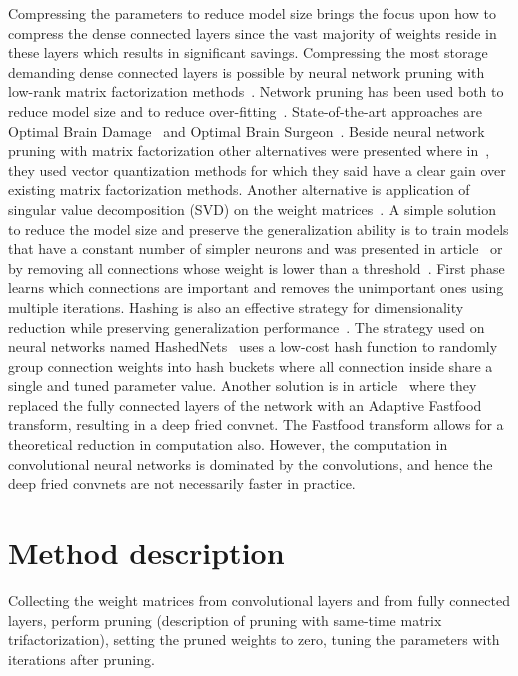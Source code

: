 \documentclass{article} %
\begin{document}
Compressing the parameters to reduce model size brings the focus upon how to 
compress the dense connected layers since the vast majority of weights reside in 
these layers which results in significant savings. Compressing the most storage 
demanding dense connected layers is possible by neural network pruning with 
low-rank matrix factorization methods~\cite{bondarenko2014artificial, 
schmidhuber2015deep, sainath2013low}. Network pruning has been used both to 
reduce model size and to reduce over-fitting~\cite{han2015learning}. 
State-of-the-art approaches are Optimal Brain Damage~\cite{lecun1989optimal} and 
Optimal Brain Surgeon~\cite{hassibi1993optimal}. Beside neural network pruning 
with matrix factorization other alternatives were presented where in~\cite{ 
DBLP:journals/corr/GongLYB14}, they used vector quantization methods for which 
they said have a clear gain over existing matrix factorization methods. Another 
alternative is application of singular value decomposition (SVD) on the weight 
matrices~\cite{xue2013restructuring}. A simple solution to reduce the model size 
and preserve the generalization ability is to train models that have a constant 
number of simpler neurons and was presented in article~\cite{collins2014memory} 
or by removing all connections whose weight is lower than a 
threshold~\cite{han2015learning}. First phase learns which connections are 
important and removes the unimportant ones using multiple iterations. Hashing is 
also an effective strategy for dimensionality reduction while preserving 
generalization performance~\cite{weinberger2009feature, shi2009hash}. The 
strategy used on neural networks named HashedNets~\cite{chen2015compressing} 
uses a low-cost hash function to randomly group connection weights into hash 
buckets where all connection inside share a single and tuned parameter value.  
Another solution is in article~\cite{yang2014deep} where they replaced the fully 
connected layers of the network with an Adaptive Fastfood transform, resulting 
in a deep fried convnet. The Fastfood transform allows for a theoretical 
reduction in computation also. However, the computation in convolutional neural 
networks is dominated by the convolutions, and hence the deep fried convnets are 
not necessarily faster in practice. 



\section{Method description}
Collecting the weight matrices from convolutional layers and from fully 
connected layers, perform pruning (description of pruning with same-time matrix 
trifactorization), setting the pruned weights to zero, tuning the parameters 
with iterations after pruning.
\end{document}
